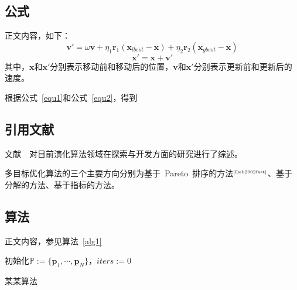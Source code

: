 \documentclass[a4paper,11pt,hyperref]{ctexart}
\begin{document}
\subsection*{公式}
正文内容，如下：
\begin{equation}
	\label{equ1}
	\bm{v}'=\omega\bm{v}+\eta_1\bm{r}_1(\bm{x}_{lbest}-\bm{x})+\eta_2\bm{r}_2(\bm{x}_{gbest}-\bm{x})
\end{equation}
\begin{equation}
	\label{equ2}
	\bm{x}'=\bm{x}+\bm{v}'
\end{equation}
其中，$\bm{x}$和$\bm{x}'$分别表示移动前和移动后的位置，$\bm{v}$和$\bm{x}'$分别表示更新前和更新后的速度。

根据公式~\ref{equ1}和公式~\ref{equ2}，得到

\subsection*{引用文献}
文献~\cite{Eiben1998evolutionary}~对目前演化算法领域在探索与开发方面的研究进行了综述。

 多目标优化算法的三个主要方向分别为基于~Pareto~排序的方法$^{\tiny\cite{Deb2002fast}}$、基于分解的方法、基于指标的方法。
\subsection*{算法}
正文内容，参见算法~\ref{alg1}
\begin{algorithm}[h]
 初始化$\mathbb{P}:=\{\mathbf{p}_1,\cdots,\mathbf{p}_N\}$，$iters:=0$\;
  \caption{某某算法}\label{alg1}
\end{algorithm}


\newpage

\end{document}
